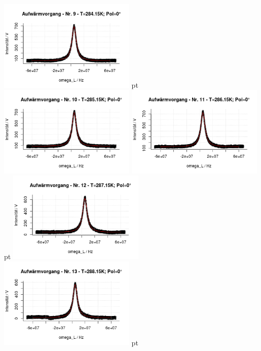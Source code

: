\documentclass[12pt]{article}
\begin{document}
\begin{minipage}[h!]{\textwidth}
	{\centering

	\includegraphics[width=0.49\textwidth]{figures/warm0-9.png} pt
	\includegraphics[width=0.49\textwidth]{figures/warm0-10.png}\vskip -10pt
	\includegraphics[width=0.49\textwidth]{figures/warm0-11.png} pt
	\includegraphics[width=0.49\textwidth]{figures/warm0-12.png}\vskip -10pt	\includegraphics[width=0.49\textwidth]{figures/warm0-13.png} pt
}
\end{minipage}
\end{document}
